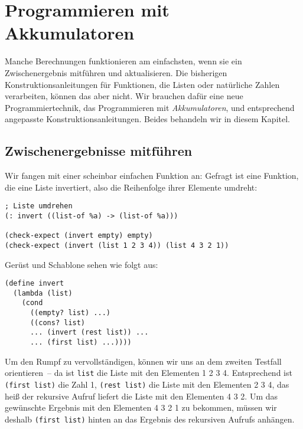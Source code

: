 
\chapter{Programmieren mit Akkumulatoren}
\label{cha:accu}

Manche Berechnungen funktionieren am einfachsten, wenn sie ein
Zwischenergebnis mitführen und aktualisieren.  Die bisherigen
Konstruktionsanleitungen für Funktionen, die Listen oder natürliche
Zahlen verarbeiten, können das aber nicht.  Wir brauchen dafür eine
neue Programmiertechnik, das Programmieren mit
\textit{Akkumulatoren}, und entsprechend angepasste
Konstruktionsanleitungen.  Beides behandeln wir in diesem Kapitel.

\section{Zwischenergebnisse mitführen}
\label{sec:intermediate-results}

%
Wir fangen mit einer scheinbar einfachen Funktion an: Gefragt ist eine
Funktion, die eine Liste invertiert, also die Reihenfolge ihrer
Elemente umdreht:\label{sec:invert}
%
\begin{lstlisting}
; Liste umdrehen
(: invert ((list-of %a) -> (list-of %a)))

(check-expect (invert empty) empty)
(check-expect (invert (list 1 2 3 4)) (list 4 3 2 1))
\end{lstlisting}
%
Gerüst und Schablone sehen wie folgt aus:
%
\begin{lstlisting}
(define invert
  (lambda (list)
    (cond
      ((empty? list) ...)
      ((cons? list)
      ... (invert (rest list)) ...
      ... (first list) ...))))
\end{lstlisting}
%
Um den Rumpf zu vervollständigen, können wir uns an dem zweiten
Testfall orientieren~-- da ist \lstinline{list} die Liste mit den
Elementen 1 2 3 4.  Entsprechend ist \lstinline{(first list)} die
Zahl 1, \lstinline{(rest list)} die Liste mit den Elementen 2 3 4, das
heiß der rekursive Aufruf liefert die Liste mit den Elementen 4 3 2.
Um das gewünschte Ergebnis mit den Elementen 4 3 2 1 zu bekommen,
müssen wir deshalb \lstinline{(first list)} hinten an das Ergebnis des
rekursiven Aufrufs anhängen.

